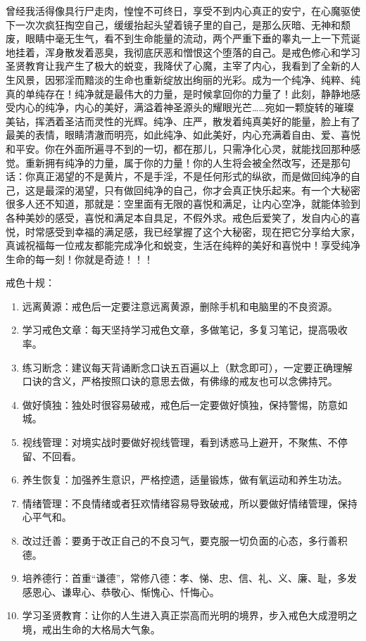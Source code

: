 曾经我活得像具行尸走肉，惶惶不可终日，享受不到内心真正的安宁，在心魔驱使下一次次疯狂掏空自己，缓缓抬起头望着镜子里的自己，是那么灰暗、无神和颓废，眼睛中毫无生气，看不到生命能量的流动，两个严重下垂的睾丸一上一下荒诞地挂着，浑身散发着恶臭，我彻底厌恶和憎恨这个堕落的自己。是戒色修心和学习圣贤教育让我产生了极大的蜕变，我降伏了心魔，主宰了内心，我看到了全新的人生风景，因邪淫而黯淡的生命也重新绽放出绚丽的光彩。成为一个纯净、纯粹、纯真的单纯存在！纯净就是最伟大的力量，是时候拿回你的力量了！此刻，静静地感受内心的纯净，内心的美好，满溢着神圣源头的耀眼光芒……宛如一颗旋转的璀璨美钻，挥洒着圣洁而灵性的光辉。纯净、庄严，散发着纯真美好的能量，脸上有了最美的表情，眼睛清澈而明亮，如此纯净、如此美好，内心充满着自由、爱、喜悦和平安。你在外面所遍寻不到的一切，都在那儿，只需净化心灵，就能找回那种感觉。重新拥有纯净的力量，属于你的力量！你的人生将会被全然改写，还是那句话：你真正渴望的不是黄片，不是手淫，不是任何形式的纵欲，而是做回纯净的自己，这是最深的渴望，只有做回纯净的自己，你才会真正快乐起来。有一个大秘密很多人还不知道，那就是：空里面有无限的喜悦和满足，让内心空净，就能体验到各种美妙的感受，喜悦和满足本自具足，不假外求。戒色后爱笑了，发自内心的喜悦，时常感受到幸福的满足感，我已经掌握了这个大秘密，现在把它分享给大家，真诚祝福每一位戒友都能完成净化和蜕变，生活在纯粹的美好和喜悦中！享受纯净生命的每一刻！你就是奇迹！！！

戒色十规：

\begin{enumerate}
    \item 远离黄源：戒色后一定要注意远离黄源，删除手机和电脑里的不良资源。
    \item 学习戒色文章：每天坚持学习戒色文章，多做笔记，多复习笔记，提高吸收率。
    \item 练习断念：建议每天背诵断念口诀五百遍以上（默念即可），一定要正确理解口诀的含义，严格按照口诀的意思去做，有佛缘的戒友也可以念佛持咒。
    \item 做好慎独：独处时很容易破戒，戒色后一定要做好慎独，保持警惕，防意如城。
    \item 视线管理：对境实战时要做好视线管理，看到诱惑马上避开，不聚焦、不停留、不回看。
    \item 养生恢复：加强养生意识，严格控遗，适量锻炼，做有氧运动和养生功法。
    \item 情绪管理：不良情绪或者狂欢情绪容易导致破戒，所以要做好情绪管理，保持心平气和。
    \item 改过迁善：要勇于改正自己的不良习气，要克服一切负面的心态，多行善积德。
    \item 培养德行：首重“谦德”，常修八德：孝、悌、忠、信、礼、义、廉、耻，多发感恩心、谦卑心、恭敬心、惭愧心、忏悔心。
    \item 学习圣贤教育：让你的人生进入真正崇高而光明的境界，步入戒色大成澄明之境，戒出生命的大格局大气象。
\end{enumerate}

